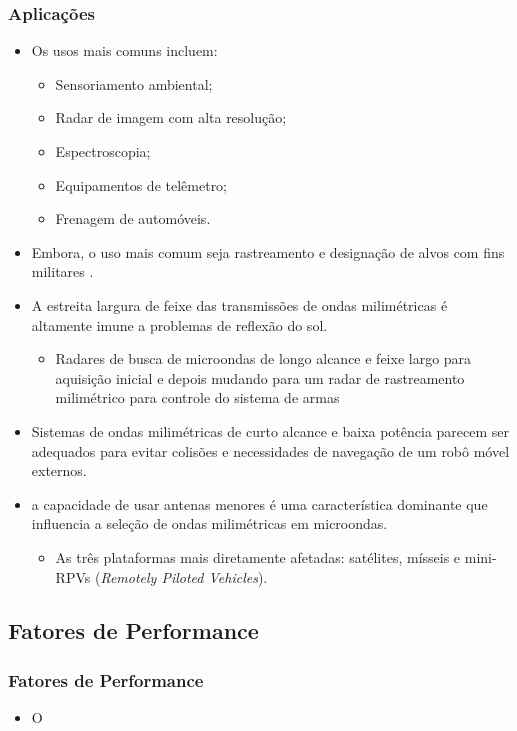 \documentclass[xcolor=dvipsnames, aspectratio=169]{beamer}
\begin{document}
    \begin{frame}
    \frametitle{Aplicações}
        \begin{itemize}
            \item Os usos mais comuns incluem:
            \begin{itemize}
                \item Sensoriamento ambiental;
                \item Radar de imagem com alta resolução;
                \item Espectroscopia;
                \item Equipamentos de telêmetro;
                \item Frenagem de automóveis.
            \end{itemize}
            \item Embora, o uso mais comum seja rastreamento e designação de alvos com fins militares \cite*{everett1995sensors}.
            \item A estreita largura de feixe das transmissões de ondas milimétricas é altamente
            imune a problemas de reflexão do sol.
            \begin{itemize}
                \item Radares de busca de microondas de longo alcance
                e feixe largo para aquisição inicial e depois mudando para um radar de rastreamento
                milimétrico para controle do sistema de armas
            \end{itemize}
            \item Sistemas de ondas milimétricas de curto alcance e baixa potência parecem ser
            adequados para evitar colisões e necessidades de navegação de um robô móvel
            externos.
            \item a capacidade de usar antenas menores é uma característica
            dominante que influencia a seleção de ondas milimétricas em microondas. 
            \begin{itemize}
                \item As três plataformas mais diretamente afetadas: satélites, mísseis e mini-RPVs (\textit{Remotely Piloted Vehicles}).
            \end{itemize}
        \end{itemize}
    \end{frame}

    \subsection[Introdução]{Fatores de Performance} 
    \begin{frame}
    \frametitle{Fatores de Performance}
        \begin{itemize}
            \item O
        \end{itemize}
    \end{frame}
\end{document}
